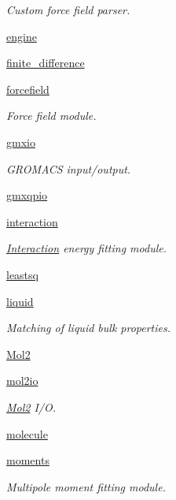 \begin{DoxyCompactItemize}
\begin{DoxyCompactList}\small\item\em Custom force field parser. \end{DoxyCompactList}\item 
\hyperlink{namespaceforcebalance_1_1engine}{engine}
\item 
\hyperlink{namespaceforcebalance_1_1finite__difference}{finite\-\_\-difference}
\item 
\hyperlink{namespaceforcebalance_1_1forcefield}{forcefield}
\begin{DoxyCompactList}\small\item\em Force field module. \end{DoxyCompactList}\item 
\hyperlink{namespaceforcebalance_1_1gmxio}{gmxio}
\begin{DoxyCompactList}\small\item\em G\-R\-O\-M\-A\-C\-S input/output. \end{DoxyCompactList}\item 
\hyperlink{namespaceforcebalance_1_1gmxqpio}{gmxqpio}
\item 
\hyperlink{namespaceforcebalance_1_1interaction}{interaction}
\begin{DoxyCompactList}\small\item\em \hyperlink{classforcebalance_1_1interaction_1_1Interaction}{Interaction} energy fitting module. \end{DoxyCompactList}\item 
\hyperlink{namespaceforcebalance_1_1leastsq}{leastsq}
\item 
\hyperlink{namespaceforcebalance_1_1liquid}{liquid}
\begin{DoxyCompactList}\small\item\em Matching of liquid bulk properties. \end{DoxyCompactList}\item 
\hyperlink{namespaceforcebalance_1_1Mol2}{Mol2}
\item 
\hyperlink{namespaceforcebalance_1_1mol2io}{mol2io}
\begin{DoxyCompactList}\small\item\em \hyperlink{namespaceforcebalance_1_1Mol2}{Mol2} I/\-O. \end{DoxyCompactList}\item 
\hyperlink{namespaceforcebalance_1_1molecule}{molecule}
\item 
\hyperlink{namespaceforcebalance_1_1moments}{moments}
\begin{DoxyCompactList}\small\item\em Multipole moment fitting module. \end{DoxyCompactList}\item 

\end{DoxyCompactItemize}
